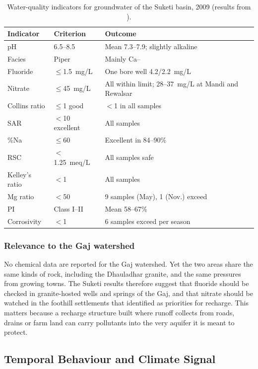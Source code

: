 \documentclass[10pt,a4paper,twocolumn]{article}
\newcommand{\mgl}{mg/L}
\begin{document}
\begin{table}[t]
\centering
\caption{Water-quality indicators for groundwater of the Suketi basin, 2009 (results from
\citealp{pophare2018}).}
\label{tab:quality}
\footnotesize
\begin{tabularx}{\columnwidth}{@{}P{1.55cm}P{1.75cm}L@{}}
\toprule
\textbf{Indicator} & \textbf{Criterion} & \textbf{Outcome}\\
\midrule
pH & 6.5--8.5 & Mean 7.3--7.9; slightly alkaline\\
Facies & Piper & Mainly Ca--\\
Fluoride & $\le$1.5~\mgl{} & One bore well 4.2/2.2~\mgl{}\\
Nitrate & $\le$45~\mgl{} & All within limit; 28--37~\mgl{} at Mandi and Rewalsar\\
Collins ratio & $\le$1 good & $<$1 in all samples\\
SAR & $<$10 excellent & All samples\\
\%Na & $\le$60 & Excellent in 84--90\%\\
RSC & $<$1.25~meq/L & All samples safe\\
Kelley's ratio & $<$1 & All samples\\
Mg ratio & $<$50 & 9 samples (May), 1 (Nov.) exceed\\
PI & Class I--II & Mean 58--67\%\\
Corrosivity & $<$1 & 6 samples exceed per season\\
\bottomrule
\end{tabularx}
\end{table}

\subsubsection{Relevance to the Gaj watershed}
No chemical data are reported for the Gaj watershed. Yet the two areas share the same kinds
of rock, including the Dhauladhar granite, and the same pressures from growing towns. The
Suketi results therefore suggest that fluoride should be checked in granite-hosted wells and
springs of the Gaj, and that nitrate should be watched in the foothill settlements that
\citet{sharma2025} identified as priorities for recharge. This matters because a recharge
structure built where runoff collects from roads, drains or farm land can carry pollutants
into the very aquifer it is meant to protect.

\subsection{Temporal Behaviour and Climate Signal}
\end{document}
